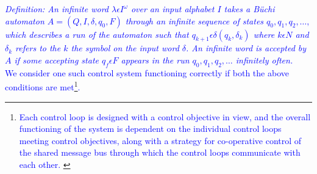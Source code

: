 \begin{frame}
\tiny{\textcolor{blue}{\textit{Definition: An infinite word $\lambda \epsilon I^\omega$ over an input alphabet $I$ takes a B\"{u}chi
automaton $A = (Q, I, \delta, q_0 , F )$ through an infinite sequence of states $q_0, q_1, q_2, \dots,$
which describes a run of the automaton such that $q_{k+1} \epsilon \delta(q_k , \delta_k )$ where $k \epsilon N$
and $\delta_k$ refers to the $k$ the symbol on the input word $\delta$. An infinite word is accepted
by $A$ if some accepting state $q_f \epsilon F$ appears in the run $q_0, q_1, q_2,\dots$  infinitely
often.}}}\\




\tiny{\textcolor{blue}{We consider one such control system functioning correctly if both the above
conditions are met\footnote{ \tiny{\textcolor{blue}{Each control loop is designed with a control objective in view, and the overall
 functioning of the system is dependent on the individual control loops meeting
 control objectives, along with a strategy for co-operative control of the shared
message bus through which the control loops communicate with each other.
}}}.}}

\end{frame}
